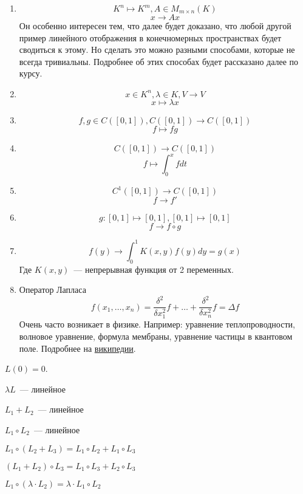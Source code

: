 \begin{examples}
    \begin{enumerate}
        \item $$K^n\mapsto K^m, A\in M_{m\times n}(K)$$ $$x\rightarrow Ax$$
            Он особенно интересен тем, что далее будет доказано, что любой другой пример линейного 
            отображения в конечномерных пространствах будет сводиться к этому. Но сделать это
            можно разными способами, которые не всегда тривиальны. Подробнее об этих способах будет 
            рассказано далее по курсу.
        \item $$
            x\in K^n, \lambda\in K, V\to V
            $$ $$
            x\mapsto \lambda x $$
        \item $$
            f,g\in C\left([0, 1]\right), C\left([0,1]\right)\to C\left([0,1]\right)
            $$ $$
            f \mapsto fg $$
        \item $$
            C\left([0,1]\right)\to C\left([0,1]\right)
            $$ $$
            f\mapsto \int_0^x f dt$$
        \item
            $$C^1\left([0,1]\right)\rightarrow C\left([0,1]\right)$$
            $$f\rightarrow f'$$
        \item $$
            g: [0, 1]\mapsto [0, 1], [0,1]\mapsto [0,1]
            $$ $$
            f \rightarrow f\circ g $$
        \item
            $$
            f(y)\rightarrow \int_0^1K(x,y)f(y)dy = g(x)
            $$
            Где $K(x,y)$~--- непрерывная функция от 2 переменных.
        \item
            Оператор Лапласа
            $$
            f(x_1,\dots,x_n) = \frac{\delta^2}{\delta x_1^2}f + \dots + \frac{\delta^2}{\delta x_n^2}f=\Delta f
            $$
            Очень часто возникает в физике. Например: уравнение теплопроводности, волновое уравнение,
            формула мембраны, уравнение частицы в квантовом поле. Подробнее на \href{https://en.wikipedia.org/wiki/Laplace_operator}{википедии}.
    \end{enumerate}
\end{examples}
\begin{properties}
\item $L(0) = 0$.
\item $\lambda L$~--- линейное
\item $L_1 + L_2$~--- линейное
\item $L_1\circ L_2$~--- линейное
\item $L_1\circ(L_2 + L_3) = L_1 \circ L_2 + L_1 \circ L_3$
\item $(L_1 + L_2) \circ L_3 = L_1 \circ L_3 + L_2 \circ L_3$
\item $L_1 \circ (\lambda\cdot L_2) = \lambda\cdot L_1 \circ L_2$
\end{properties}
